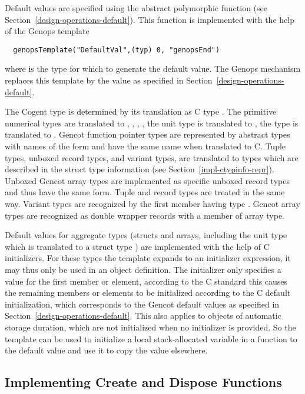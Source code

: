 Default values are specified using the abstract polymorphic function  (see Section~\ref{design-operations-default}).
This function is implemented with the help of the Genops template
\begin{verbatim}
  genopsTemplate("DefaultVal",(typ) 0, "genopsEnd")
\end{verbatim}
where  is the type for which to generate the default value. The Genops mechanism replaces this template by the value
as specified in Section~\ref{design-operations-default}.

The Cogent type is determined by its translation as C type . The primitive numerical types are translated to ,
, , , the unit type is translated to , the type  is translated to .
Gencot function pointer types are represented by abstract types with names of the form  and have the same name when
translated to C.
Tuple types, unboxed record types, and variant types, are translated to types  which are described in the struct type 
information (see Section~\ref{impl-ctypinfo-repr}). Unboxed Gencot array types are implemented as specific unboxed record types and thus
have the same form. Tuple and record types are treated in the same way. Variant types are recognized by the first member having 
type . Gencot array types are recognized as double wrapper records with a member of array type.

Default values for aggregate types (structs and arrays, including the unit type which is translated to a struct type )
are implemented with the help of C initializers. For these types the 
 template expands to an initializer expression, it may thus only be used in an object definition. The initializer 
only specifies a value for the first member or element, according to the C standard this causes the remaining members or elements to
be initialized according to the C default initialization, which corresponds to the Gencot default values as specified in 
Section~\ref{design-operations-default}. This also applies to objects of automatic storage duration, which are not initialized when
no initializer is provided. So the template can be used to initialize a local stack-allocated variable in a function to the default 
value and use it to copy the value elsewhere.

\subsection{Implementing Create and Dispose Functions}
\label{impl-operations-create}

